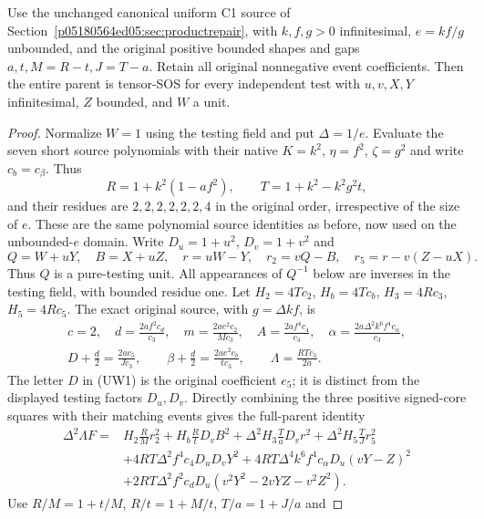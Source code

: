 \begin{theorem}
Use the unchanged canonical uniform C1 source of
Section~\ref{p05180564ed05:sec:productrepair}, with $k,f,g>0$ infinitesimal,
$e=kf/g$ unbounded, and the original positive bounded shapes and gaps
$a,t,M=R-t,J=T-a$.  Retain all original nonnegative event coefficients.
Then the entire parent is tensor-SOS for every independent test with
$u,v,X,Y$ infinitesimal, $Z$ bounded, and $W$ a unit.
\end{theorem}
\begin{proof}
Normalize $W=1$ using the testing field and put $\Delta=1/e$.
Evaluate the seven short source polynomials with their native
$K=k^2$, $\eta=f^2$, $\zeta=g^2$ and write $c_b=c_\beta$.
Thus
\[
 R=1+k^2(1-af^2),\qquad T=1+k^2-k^2g^2t,
\]
and their residues are $2,2,2,2,2,2,4$ in the original order,
irrespective of the size of $e$.  These are the same polynomial source
identities as before, now used on the unbounded-$e$ domain.
Write $D_u=1+u^2$, $D_v=1+v^2$ and
\[
 Q=W+uY,\quad B=X+uZ,\quad r=uW-Y,\quad
 r_2=vQ-B,\quad r_5=r-v(Z-uX).
\]
Thus $Q$ is a pure-testing unit.  All appearances of $Q^{-1}$ below
are inverses in the testing field, with bounded residue one.
Let $H_2=4Tc_2$, $H_b=4Tc_b$, $H_3=4Rc_3$, $H_5=4Rc_5$.
The exact original source, with $g=\Delta kf$, is
\[
\begin{gathered}
c=2,\quad d=\frac{2af^2c_d}{c_3},\quad
m=\frac{2ae^2c_2}{Mc_3},\quad
A=\frac{2af^4c_4}{c_3},\quad
\alpha=\frac{2a\Delta^2k^6f^4c_\alpha}{c_3},\\
D+\frac d2=\frac{2ac_5}{Jc_3},\qquad
\beta+\frac d2=\frac{2ae^2c_b}{tc_3},\qquad
\Lambda=\frac{RTc_3}{2a}.
\end{gathered}                                                    \tag{UW1}
\]
The letter $D$ in (UW1) is the original coefficient $e_5$; it is
distinct from the displayed testing factors $D_u,D_v$.
Directly combining the three positive signed-core squares with their
matching events gives the full-parent identity
\[
\begin{split}
\Delta^2\Lambda F={}&
 H_2\frac RM r_2^2+H_b\frac RtD_vB^2
 +\Delta^2H_3\frac TaD_vr^2
 +\Delta^2H_5\frac TJr_5^2\\
&+4RT\Delta^2f^4c_4D_uD_vY^2
 +4RT\Delta^4k^6f^4c_\alpha D_u(vY-Z)^2\\
&+2RT\Delta^2f^2c_dD_u
       (v^2Y^2-2vYZ-v^2Z^2).
\end{split}                                                       \tag{UW2}
\]
Use $R/M=1+t/M$, $R/t=1+M/t$, $T/a=1+J/a$ and

\end{proof}

